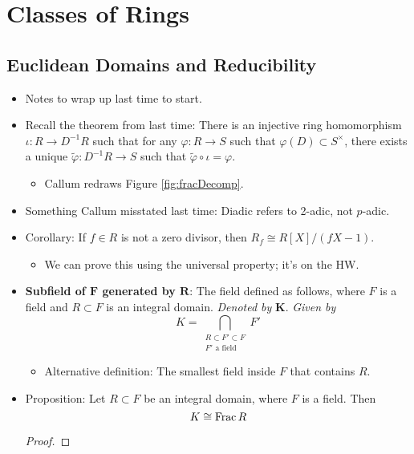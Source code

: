 \documentclass[../notes.tex]{subfiles}
\begin{document}
\chapter{Classes of Rings}
\section{Euclidean Domains and Reducibility}
\begin{itemize}
    \item {}Notes to wrap up last time to start.
    \item Recall the theorem from last time: There is an injective ring homomorphism $\iota:R\to D^{-1}R$ such that for any $\varphi:R\to S$ such that $\varphi(D)\subset S^\times$, there exists a unique $\tilde{\varphi}:D^{-1}R\to S$ such that $\tilde{\varphi}\circ\iota=\varphi$.
    \begin{itemize}
        \item Callum redraws Figure \ref{fig:fracDecomp}.
    \end{itemize}
    \item Something Callum misstated last time: Diadic refers to 2-adic, not $p$-adic.
    \item Corollary: If $f\in R$ is not a zero divisor, then $R_f\cong R[X]/(fX-1)$.
    \begin{itemize}
        \item We can prove this using the universal property; it's on the HW.
    \end{itemize}
    \item \textbf{Subfield of $\bm{F}$ generated by $\bm{R}$}: The field defined as follows, where $F$ is a field and $R\subset F$ is an integral domain. \emph{Denoted by} $\bm{K}$. \emph{Given by}
    \begin{equation*}
        K = \bigcap_{\substack{R\subset F'\subset F\\F'\text{ a field}}}F'
    \end{equation*}
    \begin{itemize}
        \item Alternative definition: The smallest field inside $F$ that contains $R$.
    \end{itemize}
    \item Proposition: Let $R\subset F$ be an integral domain, where $F$ is a field. Then
    \begin{equation*}
        K \cong \operatorname{Frac} R
    \end{equation*}
    \begin{proof}

\end{proof}
\end{itemize}
\end{document}
